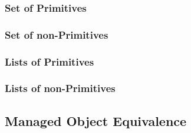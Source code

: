 \subsubsection{Set of Primitives}
\subsubsection{Set of non-Primitives}
\subsubsection{Lists of Primitives}
\subsubsection{Lists of non-Primitives}

\subsection{Managed Object Equivalence}\label{subsec:Managed Object equivalence}

